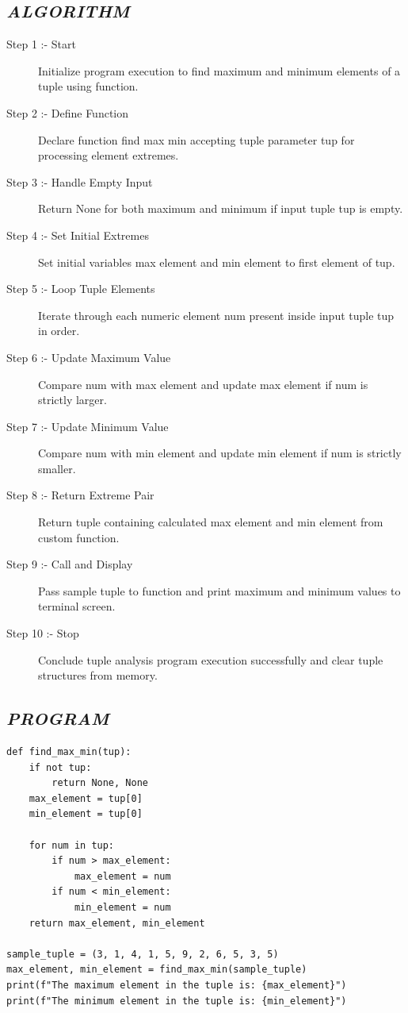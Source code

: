\documentclass[11pt,a4paper]{article}
\begin{document}
\subsection*{\textit{ALGORITHM}}
\begin{description}
  \item[Step 1 :- Start] Initialize program execution to find maximum and minimum elements of a tuple using function.
  \item[Step 2 :- Define Function] Declare function find max min accepting tuple parameter tup for processing element extremes.
  \item[Step 3 :- Handle Empty Input] Return None for both maximum and minimum if input tuple tup is empty.
  \item[Step 4 :- Set Initial Extremes] Set initial variables max element and min element to first element of tup.
  \item[Step 5 :- Loop Tuple Elements] Iterate through each numeric element num present inside input tuple tup in order.
  \item[Step 6 :- Update Maximum Value] Compare num with max element and update max element if num is strictly larger.
  \item[Step 7 :- Update Minimum Value] Compare num with min element and update min element if num is strictly smaller.
  \item[Step 8 :- Return Extreme Pair] Return tuple containing calculated max element and min element from custom function.
  \item[Step 9 :- Call and Display] Pass sample tuple to function and print maximum and minimum values to terminal screen.
  \item[Step 10 :- Stop] Conclude tuple analysis program execution successfully and clear tuple structures from memory.
\end{description}

\subsection*{\textit{PROGRAM}}
\begin{lstlisting}[style=pythonstyle]
def find_max_min(tup): 
    if not tup: 
        return None, None 
    max_element = tup[0] 
    min_element = tup[0] 
   
    for num in tup: 
        if num > max_element: 
            max_element = num 
        if num < min_element: 
            min_element = num 
    return max_element, min_element 
 
sample_tuple = (3, 1, 4, 1, 5, 9, 2, 6, 5, 3, 5) 
max_element, min_element = find_max_min(sample_tuple) 
print(f"The maximum element in the tuple is: {max_element}") 
print(f"The minimum element in the tuple is: {min_element}")
\end{lstlisting}
\end{document}
